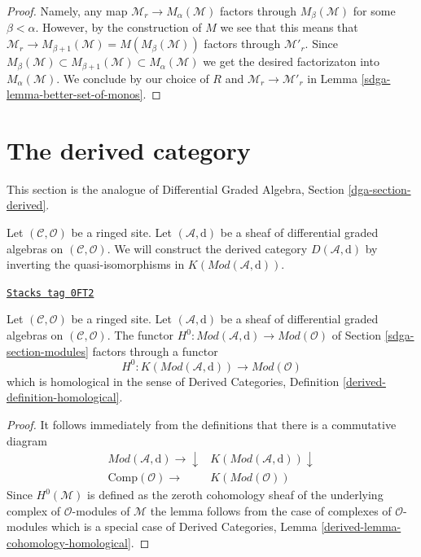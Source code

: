 \begin{proof}
\medskip\noindent
Namely, any map $\mathcal{M}_r \to M_\alpha(\mathcal{M})$
factors through $M_\beta(\mathcal{M})$ for some $\beta < \alpha$.
However, by the construction of $M$ we see that this means
that $\mathcal{M}_r \to M_{\beta + 1}(\mathcal{M}) = M(M_\beta(\mathcal{M}))$
factors through $\mathcal{M}'_r$. Since
$M_\beta(\mathcal{M}) \subset  M_{\beta + 1}(\mathcal{M})
\subset M_\alpha(\mathcal{M})$ we get the desired factorizaton
into $M_\alpha(\mathcal{M})$. We conclude by our choice of
$R$ and $\mathcal{M}_r \to \mathcal{M}'_r$ in
Lemma \ref{sdga-lemma-better-set-of-monos}.
\end{proof}

\section{The derived category}
\label{sdga-section-derived}
This section is the analogue of Differential Graded Algebra, Section
\ref{dga-section-derived}.

\medskip\noindent
Let $(\mathcal{C}, \mathcal{O})$ be a ringed site. Let
$(\mathcal{A}, \text{d})$ be a sheaf of differential graded algebras
on $(\mathcal{C}, \mathcal{O})$. We will construct the derived
category $D(\mathcal{A}, \text{d})$ by inverting the quasi-isomorphisms
in $K(\textit{Mod}(\mathcal{A}, \text{d}))$.

\begin{lemma}
\label{sdga-lemma-cohomology-homological}
\href{https://stacks.math.columbia.edu/tag/0FT2}{\texttt{Stacks tag 0FT2}}

Let $(\mathcal{C}, \mathcal{O})$ be a ringed site. Let
$(\mathcal{A}, \text{d})$ be a sheaf of differential graded algebras
on $(\mathcal{C}, \mathcal{O})$. The functor
$H^0 : \textit{Mod}(\mathcal{A}, \text{d}) \to \textit{Mod}(\mathcal{O})$
of Section \ref{sdga-section-modules} factors through a
functor
$$
H^0 : K(\textit{Mod}(\mathcal{A}, \text{d})) \to \textit{Mod}(\mathcal{O})
$$
which is homological in the sense of
Derived Categories, Definition \ref{derived-definition-homological}.
\end{lemma}

\begin{proof}
It follows immediately from the definitions that there is
a commutative diagram
$$
\begin{array}{cc}\textit{Mod}(\mathcal{A}, \text{d}) \longrightarrow\downarrow & K(\textit{Mod}(\mathcal{A}, \text{d})) \downarrow \\ \text{Comp}(\mathcal{O}) \longrightarrow & K(\textit{Mod}(\mathcal{O}))\end{array}
$$
Since $H^0(\mathcal{M})$ is defined as the zeroth cohomology
sheaf of the underlying complex of $\mathcal{O}$-modules of $\mathcal{M}$
the lemma follows from the case of complexes of $\mathcal{O}$-modules
which is a special case of
Derived Categories, Lemma \ref{derived-lemma-cohomology-homological}.
\end{proof}

